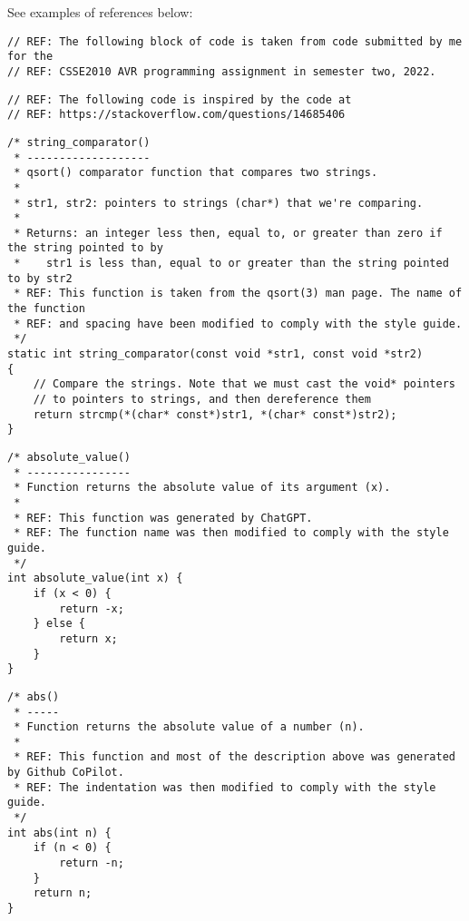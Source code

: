 \documentclass{article}
\begin{document}
See examples of references below:

\nolinenumbers
{}
\begin{lstlisting}
// REF: The following block of code is taken from code submitted by me for the
// REF: CSSE2010 AVR programming assignment in semester two, 2022. 
\end{lstlisting}

\begin{lstlisting}
// REF: The following code is inspired by the code at 
// REF: https://stackoverflow.com/questions/14685406
\end{lstlisting}

 
\begin{lstlisting}
/* string_comparator()
 * -------------------
 * qsort() comparator function that compares two strings.
 *
 * str1, str2: pointers to strings (char*) that we're comparing. 
 *
 * Returns: an integer less then, equal to, or greater than zero if the string pointed to by 
 *    str1 is less than, equal to or greater than the string pointed to by str2
 * REF: This function is taken from the qsort(3) man page. The name of the function 
 * REF: and spacing have been modified to comply with the style guide.
 */
static int string_comparator(const void *str1, const void *str2)
{
    // Compare the strings. Note that we must cast the void* pointers
    // to pointers to strings, and then dereference them
    return strcmp(*(char* const*)str1, *(char* const*)str2);
}
\end{lstlisting}

\begin{lstlisting}
/* absolute_value()
 * ----------------
 * Function returns the absolute value of its argument (x).
 *
 * REF: This function was generated by ChatGPT.
 * REF: The function name was then modified to comply with the style guide.
 */
int absolute_value(int x) {
    if (x < 0) {
        return -x;
    } else {
        return x;
    }
}
\end{lstlisting}

\begin{lstlisting}
/* abs()
 * -----
 * Function returns the absolute value of a number (n).
 *
 * REF: This function and most of the description above was generated by Github CoPilot.
 * REF: The indentation was then modified to comply with the style guide.
 */
int abs(int n) {
    if (n < 0) {
        return -n;
    }
    return n;
}
\end{lstlisting}
\end{document}
